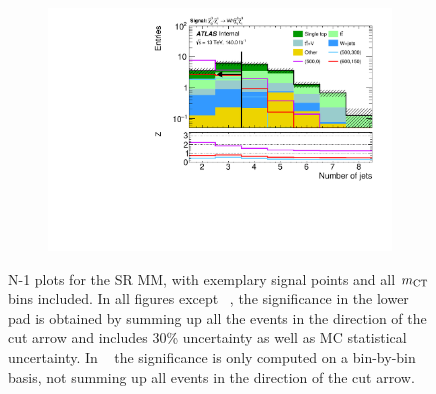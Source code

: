 \begin{figure}
\begin{subfigure}[b]{0.4\linewidth}
		\caption{\label{fig:Wh_reopt_second_round_n1_srmm_mlb1}}
	\end{subfigure}%
	\begin{subfigure}[b]{0.4\linewidth}
		\centering\includegraphics[width=\textwidth]{n1_SRMM_mct_bins/nJet30.pdf}
		\caption{\label{fig:Wh_reopt_second_round_n1_srmm_njet}}
	\end{subfigure}
	\caption{N-1 plots for the SR MM, with exemplary signal points and all $m_{\textrm{CT}}$ bins included. In all figures except \figname~, the significance in the lower pad is obtained by summing up all the events in the direction of the cut arrow and includes 30\% uncertainty as well as MC statistical uncertainty. In \figname~ the significance is only computed on a bin-by-bin basis, \ie not summing up all events in the direction of the cut arrow.}
	\label{fig:Wh_reopt_second_round_n1_srmm}
\end{figure}

